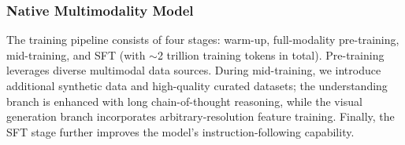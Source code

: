 \documentclass{article}
\begin{document}
\subsubsection{Native Multimodality Model}

The training pipeline consists of four stages: warm-up, full-modality pre-training, mid-training, and SFT (with $\sim$2 trillion training tokens in total). Pre-training leverages diverse multimodal data sources. During mid-training, we introduce additional synthetic data and high-quality curated datasets; the understanding branch is enhanced with long chain-of-thought reasoning, while the visual generation branch incorporates arbitrary-resolution feature training. Finally, the SFT stage further improves the model’s instruction-following capability.
\end{document}
